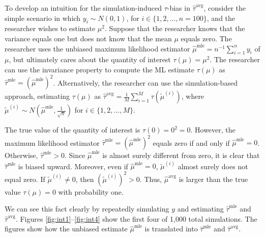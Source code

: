 \documentclass[11pt]{article}
\begin{document}
To develop an intuition for the simulation-induced $\tau$-bias in $\hat{\tau}^\text{avg}$, consider the simple scenario in which $y_i \sim N(0, 1)$, for $i \in \{1, 2, \ldots, n = 100\}$, and the researcher wishes to estimate $\mu^2$.
Suppose that the researcher knows that the variance equals one but does not know that the mean $\mu$ equals zero.
The researcher uses the unbiased maximum likelihood estimator $\hat{\mu}^\text{mle} = n^{-1}\sum_{i=1}^n y_i$ of $\mu$, but ultimately cares about the quantity of interest $\tau(\mu) = \mu^2$.
The researcher can use the invariance property to compute the ML estimate $\tau(\mu)$ as $\hat{\tau}^\text{mle} = \left( \hat{\mu}^\text{mle} \right) ^2$.
Alternatively, the researcher can use the simulation-based approach, estimating $\tau(\mu)$ as $\hat{\tau}^\text{avg} = \frac{1}{M} \sum_{i = 1}^M \tau \left( \tilde{\mu}^{(i)} \right)$, where $\tilde{\mu}^{(i)} \sim N \left( \hat{\mu}^\text{mle}, \frac{1}{\sqrt{n}} \right)$ for $i \in \{1, 2,\ldots, M\}$.

The true value of the quantity of interest is $\tau(0) = 0^2 = 0$.
However, the maximum likelihood estimator $\hat{\tau}^\text{mle} = \left( \hat{\mu}^\text{mle} \right)^2$ equals zero if and only if $\hat{\mu}^\text{mle} = 0$.
Otherwise, $\hat{\tau}^\text{mle} > 0$.
Since $\hat{\mu}^\text{mle}$ is almost surely different from zero, it is clear that $\hat{\tau}^\text{mle}$ is biased upward.
Moreover, even if $\hat{\mu}^\text{mle} = 0$, $\tilde{\mu}^{(i)}$ almost surely does not equal zero.
If $\tilde{\mu}^{(i)} \neq 0$, then $\left( \tilde{\mu}^{(i)} \right)^2 > 0$.
Thus, $\hat{\mu}^\text{avg}$ is larger than the true value $\tau(\mu) = 0$ with probability one.

We can see this fact clearly by repeatedly simulating $y$ and estimating $\hat{\tau}^\text{mle}$ and $\hat{\tau}^\text{avg}$.
Figures \ref{fig:int1}--\ref{fig:int4} show the first four of 1,000 total simulations.
The figures show how the unbiased estimate $\hat{\mu}^\text{mle}$ is translated into $\hat{\tau}^\text{mle}$ and $\hat{\tau}^\text{avg}$.
\end{document}

